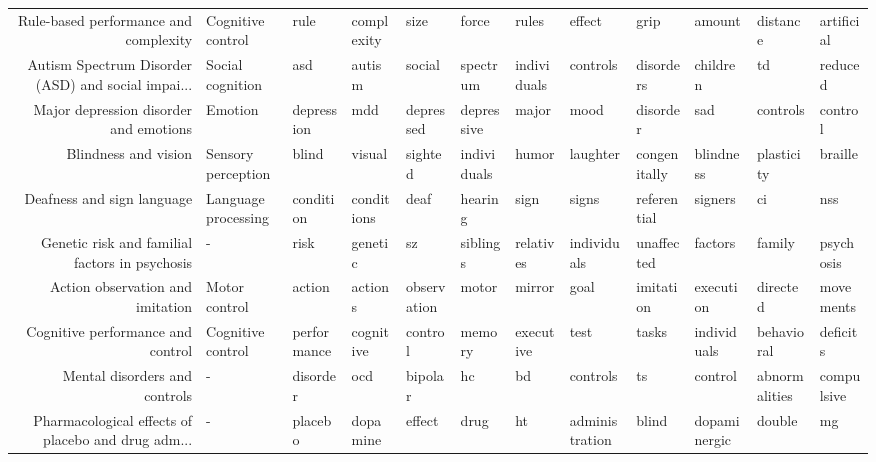 \documentclass[english]{article}
\begin{document}
\begin{landscape}
\begin{center}
\begin{supertabular}{rlllllllllll}
Rule-based performance and complexity &   Cognitive control &             rule &    complexity &            size &          force &       rules &         effect &          grip &         amount &      distance &     artificial \\
Autism Spectrum Disorder (ASD) and social impai... &    Social cognition &              asd &        autism &          social &       spectrum & individuals &       controls &     disorders &       children &            td &        reduced \\
Major depression disorder and emotions &             Emotion &       depression &           mdd &       depressed &     depressive &       major &           mood &      disorder &            sad &      controls &        control \\
                Blindness and vision &  Sensory perception &            blind &        visual &         sighted &    individuals &       humor &       laughter &  congenitally &      blindness &    plasticity &        braille \\
          Deafness and sign language & Language processing &        condition &    conditions &            deaf &        hearing &        sign &          signs &   referential &        signers &            ci &            nss \\
Genetic risk and familial factors in psychosis &                   - &             risk &       genetic &              sz &       siblings &   relatives &    individuals &    unaffected &        factors &        family &      psychosis \\
    Action observation and imitation &       Motor control &           action &       actions &     observation &          motor &      mirror &           goal &     imitation &      execution &      directed &      movements \\
   Cognitive performance and control &   Cognitive control &      performance &     cognitive &         control &         memory &   executive &           test &         tasks &    individuals &    behavioral &       deficits \\
       Mental disorders and controls &                   - &         disorder &           ocd &         bipolar &             hc &          bd &       controls &            ts &        control & abnormalities &     compulsive \\
Pharmacological effects of placebo and drug adm... &                   - &          placebo &      dopamine &          effect &           drug &          ht & administration &         blind &   dopaminergic &        double &             mg \\

\end{supertabular}
\end{center}
\end{landscape}
\end{document}
